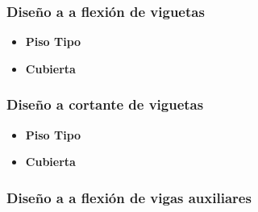 \documentclass[12pt]{article}
\begin{document}
\subsubsection{Diseño a a flexión de viguetas}
\begin{itemize}
    \item \textbf{Piso Tipo}\\
      
        \vspace{1cm}
        
        
        
        
        
        
        
   \vspace{5cm}
    \item \textbf{Cubierta}\\
    
    
    
    
    
    
    
    
    
\end{itemize}
\newpage
\subsubsection{Diseño a cortante de viguetas}

\begin{itemize}
    \item \textbf{Piso Tipo}
        \vspace{1cm}
        
        
        
        
        
        
        
   \vspace{5cm}
    \item \textbf{Cubierta}
    
    
    
    
    
    
    
\end{itemize}

\subsubsection{Diseño a a flexión de vigas auxiliares}
\end{document}

